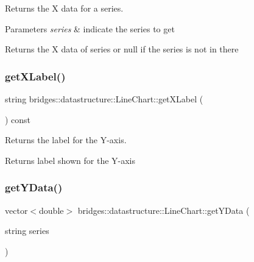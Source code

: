 Returns the X data for a series. 


\begin{DoxyParams}{Parameters}
{\em series} & indicate the series to get \\
\hline
\end{DoxyParams}
\begin{DoxyReturn}{Returns}
the X data of series or null if the series is not in there 
\end{DoxyReturn}
\mbox{\label{classbridges_1_1datastructure_1_1_line_chart_aba75962040195f35f8801714e050ad91}} 
\subsubsection{\texorpdfstring{get\+X\+Label()}{getXLabel()}}
{\footnotesize\ttfamily string bridges\+::datastructure\+::\+Line\+Chart\+::get\+X\+Label (\begin{DoxyParamCaption}{ }\end{DoxyParamCaption}) const\hspace{0.3cm}{\ttfamily [inline]}}



Returns the label for the Y-\/axis. 

\begin{DoxyReturn}{Returns}
label shown for the Y-\/axis 
\end{DoxyReturn}
\mbox{\label{classbridges_1_1datastructure_1_1_line_chart_a6a895cf47836585f8415e4d29e092085}} 
\subsubsection{\texorpdfstring{get\+Y\+Data()}{getYData()}}
{\footnotesize\ttfamily vector$<$double$>$ bridges\+::datastructure\+::\+Line\+Chart\+::get\+Y\+Data (\begin{DoxyParamCaption}\item[{string}]{series }\end{DoxyParamCaption})\hspace{0.3cm}{\ttfamily [inline]}}



